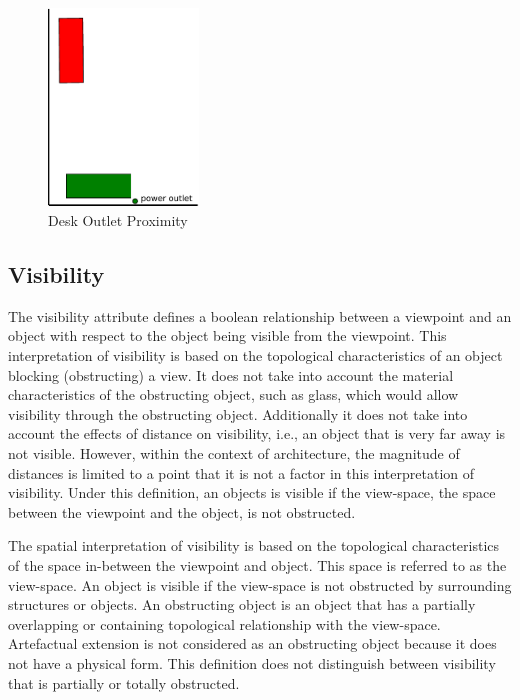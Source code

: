 \documentclass[12pt]{ucthesis}
\begin{document}
\begin{figure}[H]
 \centering
 \includegraphics[width=40mm]{desk-proximity}
 \caption{Desk Outlet Proximity}
\label{desk-proximity}
\end{figure}

\subsection{Visibility}
The visibility attribute defines a boolean relationship between a viewpoint and an object with respect to the object being visible from the viewpoint. This interpretation of visibility is based on the topological characteristics of an object blocking (obstructing) a view. It does not take into account the material characteristics of the obstructing object, such as glass, which would allow visibility through the obstructing object. Additionally it does not take into account the effects of distance on visibility, i.e., an object that is very far away is not visible. However, within the context of architecture, the magnitude of distances is limited to a point that it is not a factor in this interpretation of visibility. Under this definition, an objects is visible if the view-space, the space between the viewpoint and the object, is not obstructed.

The spatial interpretation of visibility is based on the topological characteristics of the space in-between the viewpoint and object. This space is referred to as the view-space. An object is visible if the view-space is not obstructed by surrounding structures or objects. An obstructing object is an object that has a partially overlapping or containing topological relationship with the view-space. Artefactual extension is not considered as an obstructing object because it does not have a physical form. This definition does not distinguish between visibility that is partially or totally obstructed.
\end{document}
